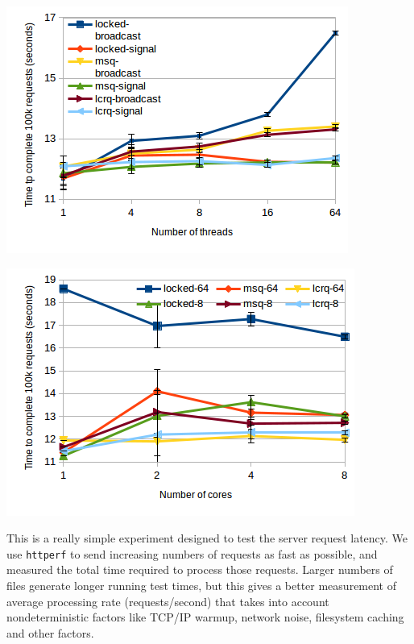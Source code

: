 \documentclass[twoside,10pt]{article}
\newenvironment{Figure}
  {\par\medskip\noindent\minipage{\linewidth}}
  {\endminipage\par\medskip}
\begin{document}
\begin{multicols}{2}
\begin{Figure}
\includegraphics[width=\linewidth]{img/latencynthreads2.png}
\end{Figure}
\begin{Figure}
  \includegraphics[width=\linewidth]{img/latencyncores.png}
\end{Figure}

This is a really simple experiment designed to test the server request
latency. We use \verb+httperf+ to send increasing numbers of requests
as fast as possible, and measured the total time required to process
those requests. Larger numbers of files generate longer running test
times, but this gives a better measurement of average processing rate
(requests/second) that takes into account nondeterministic factors
like TCP/IP warmup, network noise, filesystem caching and other factors.


\end{multicols}
\end{document}
